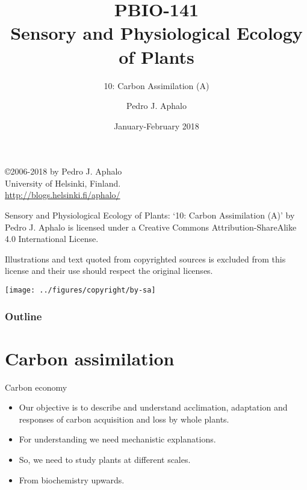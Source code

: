 \documentclass[10pt]{beamer}
\begin{document}
\title{PBIO-141\\Sensory and Physiological Ecology of  Plants}
\subtitle{10: Carbon Assimilation (A)}
\author{Pedro J. Aphalo}
\date{January-February 2018}


  \begin{frame}
    \maketitle
  \end{frame}

  \begin{frame}[c]
    \begin{center}
      \begin{small}
        \copyright 2006-2018 by Pedro J. Aphalo\\
       University of Helsinki, Finland.\\
        \textcolor{blue}{\url{http://blogs.helsinki.fi/aphalo/}}\\[2ex]
      \end{small}

      \begin{footnotesize}
        Sensory and Physiological Ecology of  Plants: `10: Carbon Assimilation (A)' by Pedro J. Aphalo is licensed under a Creative Commons Attribution-ShareAlike 4.0 International License.

        Illustrations and text quoted from copyrighted sources is excluded from this license and their use should respect the original licenses.\\[2ex]
      \end{footnotesize}

      \texttt{[image: ../figures/copyright/by-sa]}
    \end{center}
  \end{frame}

  \begin{frame}
    \frametitle{Outline}
    \tableofcontents
  \end{frame}

\section{Carbon assimilation}

\begin{frame}{Carbon economy}
    \begin{itemize}
        \item Our objective is to describe and understand acclimation, adaptation
        and responses of carbon acquisition and loss by whole
        plants.
        \item For understanding we need mechanistic explanations.%
        \item So, we need to study plants at different scales.%
        \item From biochemistry upwards.
    \end{itemize}
\end{frame}
\end{document}
